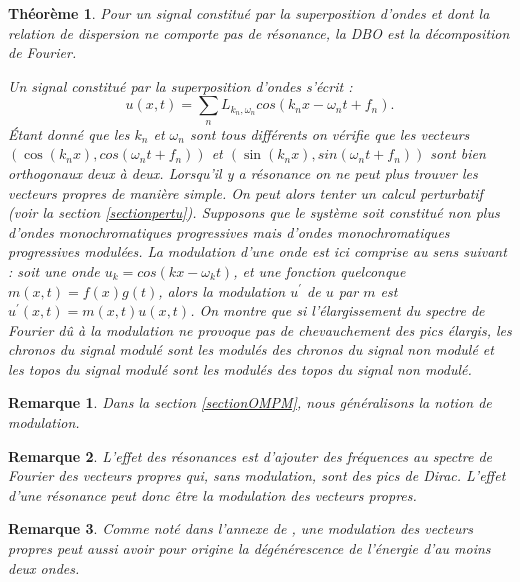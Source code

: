 \documentclass{book}
\newtheorem{thm}{Th\'eor\`eme}[chapter]
\newtheorem{rem}{Remarque}[chapter]
\newenvironment{pf}{{\bf Preuve.} \it}{\rm}
\begin{document}
\begin{thm}
Pour un signal constitu\'e par la superposition 
d'ondes et dont la relation de dispersion ne comporte pas de r\'esonance,
la DBO est la d\'ecomposition de Fourier.
\end{thm}
\begin{pf}
Un signal constitu\'e par la superposition 
d'ondes s'\'ecrit :
\begin{equation}
u(x,t)=\sum_n L_{k_n,\omega_n}cos(k_n x-\omega_n t+f_n).
\end{equation}
\'Etant donn\'e que les $k_n$ et $\omega_n$ sont tous diff\'erents
on v\'erifie que les vecteurs $(\cos(k_nx),cos(\omega_n t+f_n))$ et
$(\sin(k_nx),sin(\omega_n t+f_n))$ sont bien orthogonaux deux \`a
deux.
\end{pf}
Lorsqu'il y a r\'esonance on ne peut plus trouver les
vecteurs propres de mani\`ere simple. On peut alors tenter un calcul 
perturbatif (voir la section \ref{sectionpertu}).
Supposons que le syst\`eme soit constitu\'e
non plus d'ondes monochromatiques
progressives mais d'ondes monochromatiques
progressives modul\'ees. La modulation d'une onde
est ici 
comprise au sens suivant :
soit une onde $u_k=cos(k x-\omega_k t)$, et une fonction quelconque
$m(x,t)=f(x)g(t)$, alors la modulation $u^\prime$ de $u$ par $m$ est
$u^\prime(x,t)=m(x,t)u(x,t)$.
On montre \cite{Aubry94} que si l'\'elargissement du spectre
de Fourier d\^u \`a la modulation ne provoque pas de
chevauchement des pics \'elargis, les chronos du signal modul\'e 
sont les
modul\'es des chronos du signal non modul\'e et les topos du
signal modul\'e sont les modul\'es des topos du signal non modul\'e.

\begin{rem}
Dans la section \ref{sectionOMPM}, nous g\'en\'eralisons la notion de
modulation.  
\end{rem}

\begin{rem}
L'effet des r\'esonances est d'ajouter des fr\'equences
au spectre de Fourier des vecteurs propres qui, sans modulation,
sont des pics de Dirac.
L'effet d'une r\'esonance peut donc \^etre la modulation des
vecteurs propres.
\end{rem}

\begin{rem}
Comme not\'e dans l'annexe de \cite{Madon96b}, une modulation
des vecteurs propres peut aussi avoir pour origine
la d\'eg\'en\'erescence de l'\'energie d'au moins deux ondes.
\end{rem}
\end{document}
